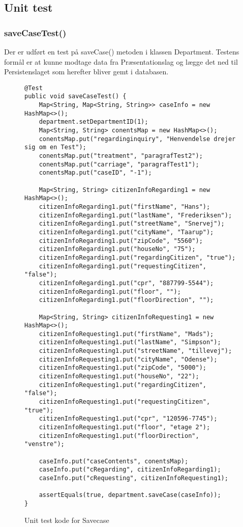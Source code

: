 \subsection{Unit test}
\subsubsection{saveCaseTest()}
Der er udført en test på saveCase() metoden  i klassen Department. Testens formål er at kunne modtage data fra Præsentationslag og lægge det ned til Persistenslaget som herefter bliver gemt i databasen.  \\
\begin{figure}[htb!]
\begin{lstlisting}
@Test
public void saveCaseTest() {
	Map<String, Map<String, String>> caseInfo = new HashMap<>();
	department.setDepartmentID(1);
	Map<String, String> conentsMap = new HashMap<>();
	conentsMap.put("regardinginquiry", "Henvendelse drejer sig om en Test");
	conentsMap.put("treatment", "paragrafTest2");
	conentsMap.put("carriage", "paragrafTest1");
	conentsMap.put("caseID", "-1");
	
	Map<String, String> citizenInfoRegarding1 = new HashMap<>();
	citizenInfoRegarding1.put("firstName", "Hans");
	citizenInfoRegarding1.put("lastName", "Frederiksen");
	citizenInfoRegarding1.put("streetName", "Snervej");
	citizenInfoRegarding1.put("cityName", "Taarup");
	citizenInfoRegarding1.put("zipCode", "5560");
	citizenInfoRegarding1.put("houseNo", "75");
	citizenInfoRegarding1.put("regardingCitizen", "true");
	citizenInfoRegarding1.put("requestingCitizen", "false");
	citizenInfoRegarding1.put("cpr", "887799-5544");
	citizenInfoRegarding1.put("floor", "");
	citizenInfoRegarding1.put("floorDirection", "");
	
	Map<String, String> citizenInfoRequesting1 = new HashMap<>();
	citizenInfoRequesting1.put("firstName", "Mads");
	citizenInfoRequesting1.put("lastName", "Simpson");
	citizenInfoRequesting1.put("streetName", "tillevej");
	citizenInfoRequesting1.put("cityName", "Odense");
	citizenInfoRequesting1.put("zipCode", "5000");
	citizenInfoRequesting1.put("houseNo", "22");
	citizenInfoRequesting1.put("regardingCitizen", "false");
	citizenInfoRequesting1.put("requestingCitizen", "true");
	citizenInfoRequesting1.put("cpr", "120596-7745");
	citizenInfoRequesting1.put("floor", "etage 2");
	citizenInfoRequesting1.put("floorDirection", "venstre");
	
	caseInfo.put("caseContents", conentsMap);
	caseInfo.put("cRegarding", citizenInfoRegarding1);
	caseInfo.put("cRequesting", citizenInfoRequesting1);
	
	assertEquals(true, department.saveCase(caseInfo));
}
\end{lstlisting}
\caption{Unit test kode for Savecase}
\label{kode:savetest}
\end{figure}\\

